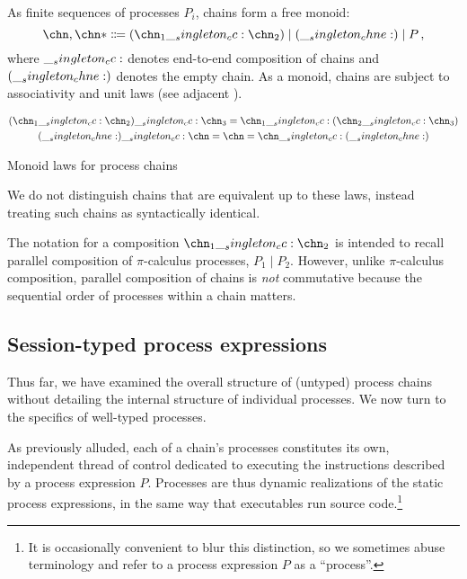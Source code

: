 As finite sequences of processes $P_i$, chains form a free monoid:
\begin{equation*}
  \chn,\chn* \Coloneqq (\chn_1 \cc \chn_2) \mid (\chne) \mid P
  \,,
\end{equation*}
where $\__singleton_cc:$ denotes end-to-end composition of chains and $(\__singleton_chne:)$ denotes the empty chain.
As a monoid, chains are subject to associativity and unit laws (see adjacent ).
\begin{marginfigure}
\begin{gather*}
  (\chn_1 \cc \chn_2) \cc \chn_3 = \chn_1 \cc (\chn_2 \cc \chn_3) \\
  (\chne) \cc \chn = \chn = \chn \cc (\chne)
\end{gather*}
\caption{Monoid laws for process chains}\label{fig:chains:monoid-laws}
\end{marginfigure}
We do not distinguish chains that are equivalent up to these laws, instead treating such chains as syntactically identical.

The notation for a composition $\chn_1 \cc \chn_2$ is intended to recall parallel composition of $\pi$-calculus processes, $P_1 \mid P_2$.
However, unlike $\pi$-calculus composition, parallel composition of chains is \emph{not} commutative because the sequential order of processes within a chain matters.


\subsection{Session-typed process expressions}\label{sec:process-chains:typed-processes}

Thus far, we have examined the overall structure of (untyped) process chains without detailing the internal structure of individual processes.
We now turn to the specifics of well-typed processes.

As previously alluded, each of a chain's processes constitutes its own, independent thread of control dedicated to executing the instructions described by a process expression $P$.
Processes are thus dynamic realizations of the static process expressions, in the same way that executables run source code.\footnote{It is occasionally convenient to blur this distinction, so we sometimes abuse terminology and refer to a process expression $P$ as a \enquote{process}.}


